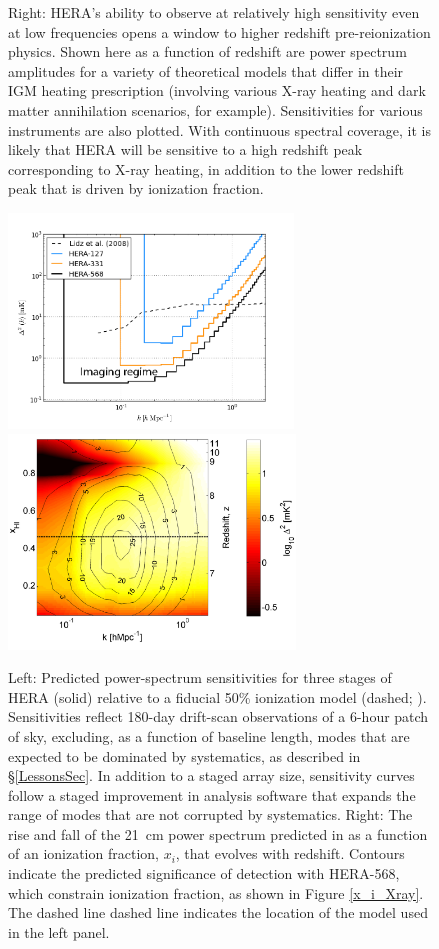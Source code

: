 \documentclass[preprint]{aastex}
\begin{document}
\begin{figure}[!ht]
{Right: HERA's ability to
observe at relatively high sensitivity even at low frequencies opens a window to
higher redshift pre-reionization physics.  Shown here as a function of redshift are power spectrum amplitudes
for a variety of theoretical models that differ in their IGM heating prescription (involving various X-ray heating
and dark matter annihilation scenarios, for example).  Sensitivities for various instruments are also plotted.
With continuous spectral coverage, it is likely that HERA will be sensitive to a high redshift peak corresponding
to X-ray heating, in addition to the lower redshift peak that is driven by ionization fraction.
}\label{fig:x_i_Xray}
\end{figure}

\begin{figure}[!ht]\centering
\includegraphics[height=2.25in]{plots/eor_pspec.png}
~ %
\includegraphics[height=2.25in]{plots/hera_snr_contour.png}
\caption{\small
Left: Predicted power-spectrum sensitivities for three stages of
HERA (solid) relative to a fiducial 50\% ionization model 
(dashed; \citealt{lidz_et_al2008}).  Sensitivities reflect
180-day drift-scan observations of a 6-hour patch of sky, excluding,
as a function of baseline length, modes that are expected to be
dominated by systematics, as described in \S\ref{LessonsSec}.  In addition
to a staged array size, sensitivity curves follow
a staged improvement in analysis software that expands the range
of modes that are not corrupted by systematics.  
Right: 
The rise and fall of the 21~cm power spectrum predicted in
\citep{lidz_et_al2008} as a function of an ionization fraction, $x_i$,
that evolves with redshift.  Contours indicate the predicted significance
of detection with HERA-568, which constrain ionization fraction, as shown in
Figure \ref{x_i_Xray}.  The dashed line dashed line indicates the location
of the model used in the left panel.
}\label{fig:eor_pspec}
\end{figure}
\end{document}
